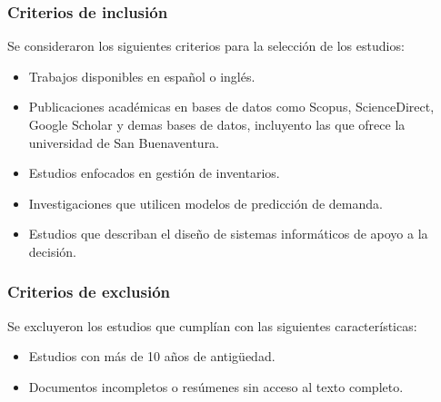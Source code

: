 \subsubsection{Criterios de inclusión}

Se consideraron los siguientes criterios para la selección de los estudios:

\begin{itemize}
    \item Trabajos disponibles en español o inglés.
    \item Publicaciones académicas en bases de datos como Scopus, ScienceDirect, Google Scholar y demas bases de datos, incluyento las que ofrece la universidad de San Buenaventura.
    \item Estudios enfocados en gestión de inventarios.
    \item Investigaciones que utilicen modelos de predicción de demanda.
    \item Estudios que describan el diseño de sistemas informáticos de apoyo a la decisión.
\end{itemize}

\subsubsection{Criterios de exclusión}

Se excluyeron los estudios que cumplían con las siguientes características:

\begin{itemize}
    \item Estudios con más de 10 años de antigüedad.
    \item Documentos incompletos o resúmenes sin acceso al texto completo.
\end{itemize}